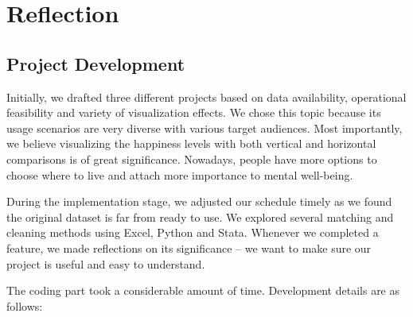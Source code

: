 \documentclass{article}
\begin{document}
\section{Reflection}
\subsection{Project Development}

Initially, we drafted three different projects based on data availability, operational feasibility and variety of visualization effects. We chose this topic because its usage scenarios are very diverse with various target audiences. Most importantly, we believe visualizing the happiness levels with both vertical and horizontal comparisons is of great significance. Nowadays, people have more options to choose where to live and attach more importance to mental well-being.

During the implementation stage, we adjusted our schedule timely as we found the original dataset is far from ready to use. We explored several matching and cleaning methods using Excel, Python and Stata. Whenever we completed a feature, we made reflections on its significance -- we want to make sure our project is useful and easy to understand. 

The coding part took a considerable amount of time. Development details are as follows:
\end{document}

